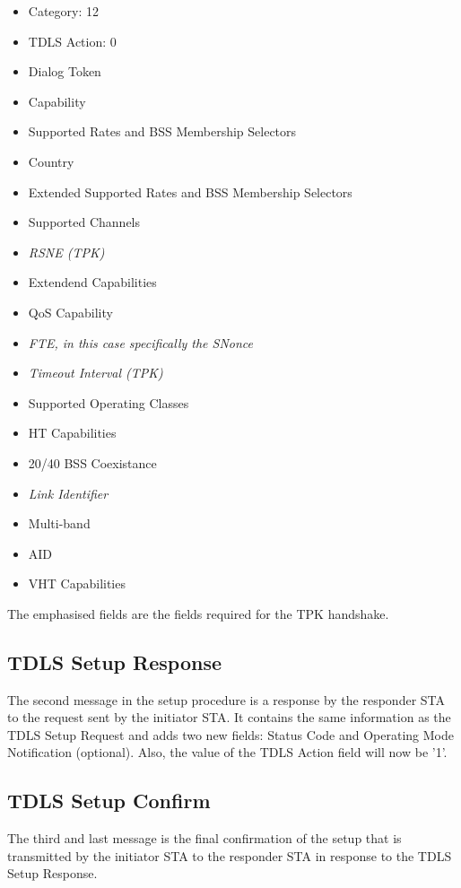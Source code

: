 \begin{itemize}
	\item Category: 12
	\item TDLS Action: 0
	\item Dialog Token
	\item Capability
	\item Supported Rates and BSS Membership Selectors
	\item Country
	\item Extended Supported Rates and BSS Membership Selectors
	\item Supported Channels
	\item \emph{RSNE (TPK)}
	\item Extendend Capabilities
	\item QoS Capability
	\item \emph{FTE, in this case specifically the SNonce}
	\item \emph{Timeout Interval (TPK)}
	\item Supported Operating Classes
	\item HT Capabilities
	\item 20/40 BSS Coexistance
	\item \emph{Link Identifier}
	\item Multi-band
	\item AID
	\item VHT Capabilities
\end{itemize} 

The emphasised fields are the fields required for the TPK handshake.

\subsection{TDLS Setup Response}

The second message in the setup procedure is a response by the responder STA to the request sent by the initiator STA. It contains the same information as the TDLS Setup Request and adds two new fields: Status Code and Operating Mode Notification (optional). Also, the value of the TDLS Action field will now be '1'.

\subsection{TDLS Setup Confirm}

The third and last message is the final confirmation of the setup that is transmitted by the initiator STA to the responder STA in response to the TDLS Setup Response.

